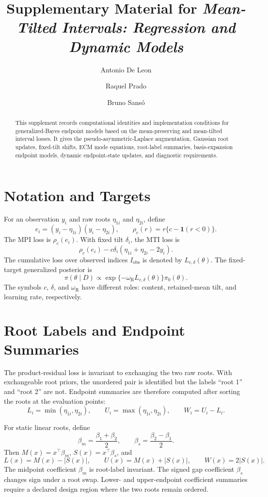 \documentclass[11pt]{article}
\title{Supplementary Material for \emph{Mean-Tilted Intervals:
Regression and Dynamic Models}}
\author{Antonio De Leon \and Raquel Prado \and Bruno Sans\'o}
\date{}
\newcommand{\ind}{\mathbf{1}}
\begin{document}
\maketitle

\begin{abstract}
\noindent
This supplement records computational identities and implementation conditions
for generalized-Bayes endpoint models based on the mean-preserving and
mean-tilted interval losses. It gives the pseudo-asymmetric-Laplace
augmentation, Gaussian root updates, fixed-tilt shifts, ECM mode equations,
root-label summaries, basis-expansion endpoint models, dynamic endpoint-state
updates, and diagnostic requirements.
\end{abstract}

\section{Notation and Targets}
\label{sec:supp-targets}

For an observation \(y_i\) and raw roots \(\eta_{1i}\) and \(\eta_{2i}\),
define
\[
e_i=(y_i-\eta_{1i})(y_i-\eta_{2i}),\qquad
\rho_c(r)=r\{c-\ind(r<0)\}.
\]
The MPI loss is \(\rho_c(e_i)\). With fixed tilt \(\delta_i\), the MTI loss is
\[
\rho_c(e_i)-c\delta_i(\eta_{1i}+\eta_{2i}-2y_i).
\]
The cumulative loss over observed indices \(I_{\mathrm{obs}}\) is denoted by
\(L_{c,\delta}(\theta)\). The fixed-target generalized posterior is
\[
\pi(\theta\mid D)
\propto
\exp\{-\omega_{\mathrm R}L_{c,\delta}(\theta)\}\pi_0(\theta).
\]
The symbols \(c\), \(\delta\), and \(\omega_{\mathrm R}\) have different roles:
content, retained-mean tilt, and learning rate, respectively.

\section{Root Labels and Endpoint Summaries}
\label{sec:supp-labels}

The product-residual loss is invariant to exchanging the two raw roots. With
exchangeable root priors, the unordered pair is identified but the labels
``root 1'' and ``root 2'' are not. Endpoint summaries are therefore computed
after sorting the roots at the evaluation points:
\[
L_i=\min(\eta_{1i},\eta_{2i}),\qquad
U_i=\max(\eta_{1i},\eta_{2i}),\qquad
W_i=U_i-L_i.
\]

For static linear roots, define
\[
\beta_m=\frac{\beta_1+\beta_2}{2},\qquad
\beta_s=\frac{\beta_2-\beta_1}{2}.
\]
Then \(M(x)=x^\top\beta_m\), \(S(x)=x^\top\beta_s\), and
\[
L(x)=M(x)-|S(x)|,\qquad
U(x)=M(x)+|S(x)|,\qquad
W(x)=2|S(x)|.
\]
The midpoint coefficient \(\beta_m\) is root-label invariant. The signed gap
coefficient \(\beta_s\) changes sign under a root swap. Lower- and
upper-endpoint coefficient summaries require a declared design region where the
two roots remain ordered.
\end{document}
